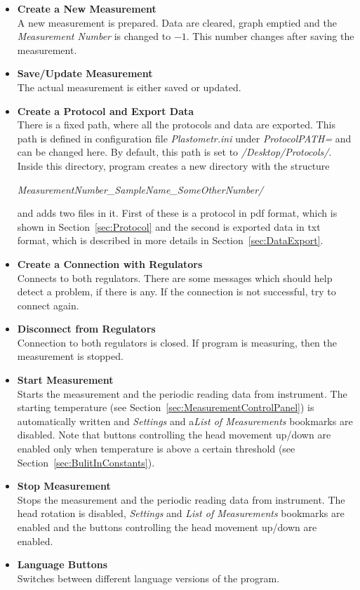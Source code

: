 \documentclass[a4paper,11pt,oneside]{report}
\theoremstyle{named}
\begin{document}
\begin{itemize}
  \item \textbf{Create a New Measurement} \\
    A new measurement is prepared. Data are cleared, graph emptied and the
    \textit{Measurement Number} is changed to $-1$. This number changes after
    saving the measurement. 
  \item \textbf{Save/Update Measurement} \\
    The actual measurement is either saved or updated.
  \item \textbf{Create a Protocol and Export Data} \\
    There is a fixed path, where all the protocols and data are exported. This
    path is defined in configuration file \textit{Plastometr.ini} under
    \textit{ProtocolPATH=} and can be changed here. By default, this path is set
    to \textit{/Desktop/Protocols/}. Inside this directory, program creates a
    new directory with the structure

    \textit{MeasurementNumber\_SampleName\_SomeOtherNumber/} 
    
    and adds two files in it. First of these is a protocol in pdf format,
    which is shown in Section~\ref{sec:Protocol} and the second is exported data
    in txt format, which is described in more details in
    Section~\ref{sec:DataExport}.  
  \item \textbf{Create a Connection with Regulators} \\
    Connects to both regulators. There are some messages which should help
    detect a problem, if there is any. If the connection is not successful, try
    to connect again.
  \item \textbf{Disconnect from Regulators} \\
    Connection to both regulators is closed. If program is measuring, then the
    measurement is stopped.
  \item \textbf{Start Measurement} \\
    Starts the measurement and the periodic reading data from instrument. The
    starting temperature (see Section~\ref{sec:MeasurementControlPanel}) is
    automatically written and \textit{Settings} and a\textit{List of
    Measurements} bookmarks are disabled. Note that buttons controlling the head
    movement up/down are enabled only when temperature is above a certain
    threshold (see Section~\ref{sec:BulitInConstants}).  
  \item \textbf{Stop Measurement} \\
    Stops the measurement and the periodic reading data from instrument. The
    head rotation is disabled, \textit{Settings} and \textit{List of
    Measurements} bookmarks are enabled and the buttons controlling the head
    movement up/down are enabled.  
  \item \textbf{Language Buttons} \\
    Switches between different language versions of the program. 
\end{itemize}
\end{document}
